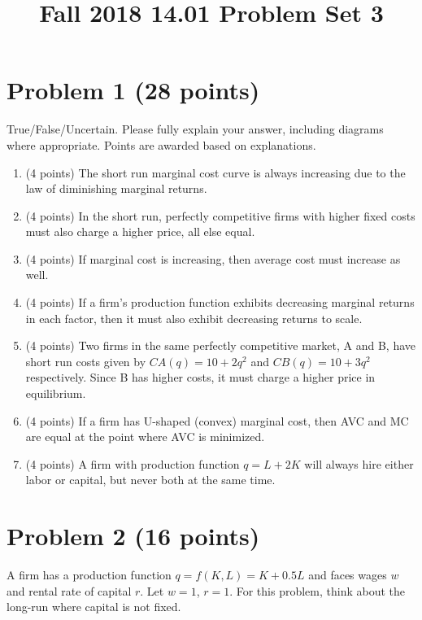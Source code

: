 \documentclass{article}
\begin{document}
\title{Fall 2018 14.01 Problem Set 3}
\maketitle

\section*{Problem 1 (28 points)} 

True/False/Uncertain. Please fully explain your answer, including diagrams where appropriate. Points are awarded based on explanations.

\begin{enumerate}
\item (4 points) The short run marginal cost curve is always increasing due to the law of diminishing marginal returns.
\item (4 points) In the short run, perfectly competitive firms with higher fixed costs must also charge a higher price, all else equal.
\item (4 points) If marginal cost is increasing, then average cost must increase as well.
\item (4 points) If a firm’s production function exhibits decreasing marginal returns in each factor, then it must also exhibit decreasing returns to scale.
\item (4 points) Two firms in the same perfectly competitive market, A and B, have short run costs given by $CA(q) = 10 + 2q^2$ and $CB(q) = 10 + 3q^2$ respectively. Since B has higher costs, it must charge a higher price in equilibrium.
\item (4 points) If a firm has U-shaped (convex) marginal cost, then AVC and MC are equal at the point where AVC is minimized.
\item (4 points) A firm with production function $q = L + 2K$ will always hire either labor or capital, but never both at the same time.
\end{enumerate}
\newpage

\section*{Problem 2 (16 points)}

A firm has a production function $q = f(K, L) = K + 0.5L$ and faces wages $w$ and rental rate of capital $r$. Let $w = 1$, $r = 1$. For this problem, think about the long-run where capital is not fixed.
\end{document}
